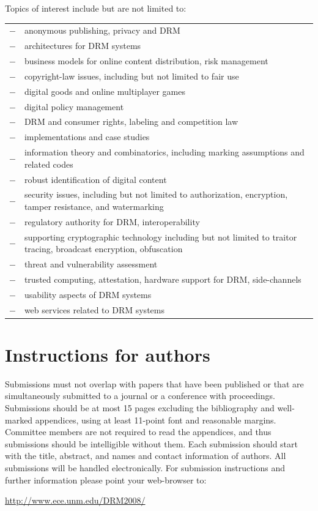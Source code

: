\documentclass{article}
\begin{document}
\begin{tabularx}{\linewidth}
  Topics of interest include but are not limited to:\par\smallskip
  {\small
  \begin{tabular}{l@{\thinspace}p{.92\hsize}}
    $-$ & anonymous publishing, privacy and DRM\\
    $-$ & architectures for DRM systems\\
    $-$ & business models for online content distribution, risk management\\
    $-$ & copyright-law issues, including but not limited to fair use\\
    $-$ & digital goods and online multiplayer games\\
    $-$ & digital policy management\\
    $-$ & DRM and consumer rights, labeling and competition law\\
    $-$ & implementations and case studies\\
    $-$ & information theory and combinatorics, including marking
    assumptions and related codes\\
    $-$ & robust identification of digital content\\
    $-$ & security issues, including but not limited to authorization,
    encryption, tamper resistance, and watermarking\\
    $-$ & regulatory authority for DRM, interoperability\\
    $-$ & supporting cryptographic technology including but not limited to
    traitor tracing, broadcast encryption, obfuscation\\
    $-$ & threat and vulnerability assessment\\
    $-$ & trusted computing, attestation, hardware support for DRM,
    side-channels\\ 
    $-$ & usability aspects of DRM systems\\
    $-$ & web services related to DRM systems
  \end{tabular}}


  \section*{Instructions for authors}

  Submissions must not overlap with papers that have been published or
  that are simultaneously submitted to a journal or a conference with
  proceedings. Submissions should be at most 15 pages excluding the
  bibliography and well-marked appendices, using at least 11-point
  font and reasonable margins. Committee members are not required to
  read the appendices, and thus submissions should be intelligible
  without them. Each submission should start with the title, abstract,
  and names and contact information of authors. All submissions will
  be handled electronically.  For submission instructions and further
  information please point your web-browser to:
  \begin{center}
    \url{http://www.ece.unm.edu/DRM2008/}
  \end{center}
  

\end{tabularx}
\end{document}
